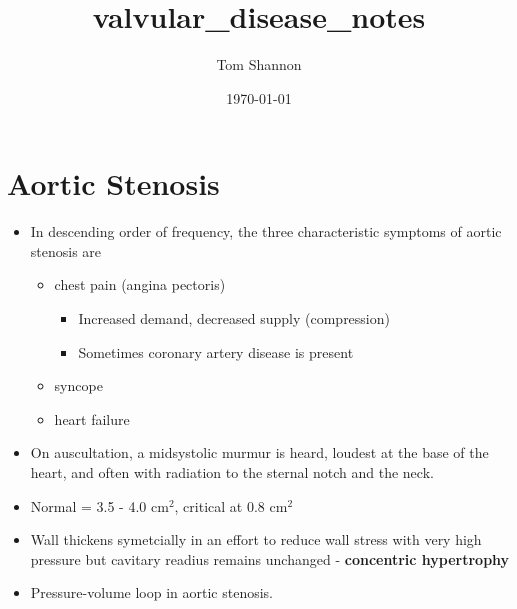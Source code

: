 \documentclass[11pt]{article}
\author{Tom Shannon}
\date{\today}
\title{valvular\_disease\_notes}
\begin{document}
\maketitle
\tableofcontents

\section{Aortic Stenosis}
\label{sec:AorticStenosis}

\begin{itemize}
\item In descending order of frequency, the three characteristic symptoms of aortic stenosis are
  \begin{itemize}
  \item chest pain (angina pectoris)
    \begin{itemize}
    \item Increased demand, decreased supply (compression)
    \item Sometimes coronary artery disease is present
    \end{itemize}
\item syncope
\item heart failure
\end{itemize}
\item On auscultation, a midsystolic murmur is heard, loudest at the base of the heart, and often with radiation to the sternal notch and the neck.
\item Normal = 3.5 - 4.0 cm$^2$, critical at 0.8 cm$^2$
\item Wall thickens symetcially in an effort to reduce wall stress with very high pressure but cavitary readius remains unchanged - \textbf{concentric hypertrophy}
\item Pressure-volume loop in aortic stenosis.


\end{itemize}
\end{document}

